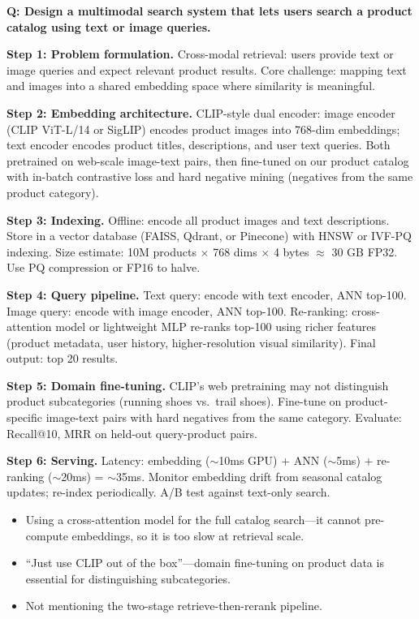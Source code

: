 \begin{interviewq}
\textbf{Q: Design a multimodal search system that lets users search a product catalog using text or image queries.}

 \quad {} \quad \badgefreq{\freqmed}

\stronganswer

\textbf{Step 1: Problem formulation.} Cross-modal retrieval: users provide text or image queries and expect relevant product results. Core challenge: mapping text and images into a shared embedding space where similarity is meaningful.

\textbf{Step 2: Embedding architecture.} CLIP-style dual encoder: image encoder (CLIP ViT-L/14 or SigLIP) encodes product images into 768-dim embeddings; text encoder encodes product titles, descriptions, and user text queries. Both pretrained on web-scale image-text pairs, then fine-tuned on our product catalog with in-batch contrastive loss and hard negative mining (negatives from the same product category).

\textbf{Step 3: Indexing.} Offline: encode all product images and text descriptions. Store in a vector database (FAISS, Qdrant, or Pinecone) with HNSW or IVF-PQ indexing. Size estimate: 10M products $\times$ 768 dims $\times$ 4 bytes $\approx$ 30 GB FP32. Use PQ compression or FP16 to halve.

\textbf{Step 4: Query pipeline.} Text query: encode with text encoder, ANN top-100. Image query: encode with image encoder, ANN top-100. Re-ranking: cross-attention model or lightweight MLP re-ranks top-100 using richer features (product metadata, user history, higher-resolution visual similarity). Final output: top 20 results.

\textbf{Step 5: Domain fine-tuning.} CLIP's web pretraining may not distinguish product subcategories (running shoes vs.\ trail shoes). Fine-tune on product-specific image-text pairs with hard negatives from the same category. Evaluate: Recall@10, MRR on held-out query-product pairs.

\textbf{Step 6: Serving.} Latency: embedding ($\sim$10ms GPU) + ANN ($\sim$5ms) + re-ranking ($\sim$20ms) = $\sim$35ms. Monitor embedding drift from seasonal catalog updates; re-index periodically. A/B test against text-only search.

\redflags
\begin{itemize}
    \item Using a cross-attention model for the full catalog search---it cannot pre-compute embeddings, so it is too slow at retrieval scale.
    \item ``Just use CLIP out of the box''---domain fine-tuning on product data is essential for distinguishing subcategories.
    \item Not mentioning the two-stage retrieve-then-rerank pipeline.
\end{itemize}


\end{interviewq}
